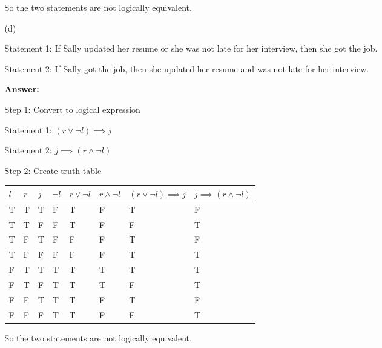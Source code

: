 \documentclass[12pt]{extreport}
\newcommand{\answer}[0]{\medskip \textbf{Answer:} \medskip}
\begin{document}
\begin{enumerate}
\begin{enumerate}
                So the two statements are not logically equivalent.

            \item[(d)] 
            
            Statement 1: If Sally updated her resume or she was not late for her interview, then she got the job.

            Statement 2: If Sally got the job, then she updated her resume and was not late for her interview.

                \answer

                Step 1: Convert to logical expression

                Statement 1: \( (r \lor \neg l) \implies j \)

                Statement 2: \( j \implies (r \land \neg l) \)

                \medskip

                Step 2: Create truth table

                \begin{tabular}{|l|l|l|l|l|l|l|l|}
                    \hline
                    \( l \) & \( r \) & \( j \) & \( \neg l \) & \( r \lor \neg l \) & \( r \land \neg l \) & \( (r \lor \neg l) \implies j \) & \( j \implies (r \land \neg l) \) \\ \hline
                    T & T & T & F & T & F & T & F \\ \hline
                    T & T & F & F & T & F & F & T \\ \hline
                    T & F & T & F & F & F & T & F \\ \hline
                    T & F & F & F & F & F & T & T \\ \hline
                    F & T & T & T & T & T & T & T \\ \hline
                    F & T & F & T & T & T & F & T \\ \hline
                    F & F & T & T & T & F & T & F \\ \hline
                    F & F & F & T & T & F & F & T \\ \hline
                \end{tabular}

                So the two statements are not logically equivalent.

        \end{enumerate}

\end{enumerate}
\newpage
\end{document}
